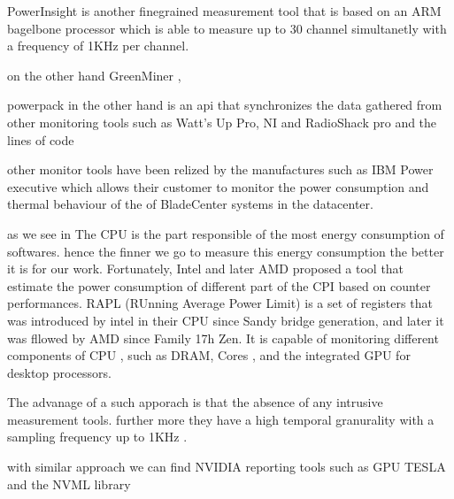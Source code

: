 PowerInsight \cite{laros2013powerinsight} is another finegrained measurement tool that is based on an ARM bagelbone processor \cite{coley2012beaglebone} which is able to measure up to 30 channel simultanetly with a frequency of 1KHz per channel.

on the other hand GreenMiner \cite{hindle2014greenminer}, %

powerpack \cite{ge2009powerpack} in the other hand is an api that synchronizes the data gathered from other monitoring tools such as Watt’s Up Pro, NI and RadioShack pro and the lines of code %

other monitor tools have been relized by the manufactures such as IBM Power executive \cite{koomey2011growth} which allows their customer to monitor the power consumption and thermal behaviour of the of BladeCenter systems in the datacenter.




as we see in %
The CPU is the part responsible of the most energy consumption of softwares. hence the finner we go to measure this energy consumption the better it is for our work.
Fortunately, Intel and later AMD proposed a tool that estimate the power consumption of different part of the CPI based on counter performances. RAPL (RUnning Average Power Limit) \cite{hackenberg2013power} \cite{hackenberg2015energy} is a set of registers that was introduced by intel in their CPU since Sandy bridge generation, and later it was fllowed by AMD since Family 17h Zen.
It is capable of monitoring different components of CPU , such as DRAM, Cores , and the integrated GPU for desktop processors.


The advanage of a such apporach is that the absence of any intrusive measurement tools. further more they have a high temporal granurality with a sampling frequency up to 1KHz \cite{ilsche_power_2015}.

with similar approach we can find NVIDIA reporting tools such as GPU TESLA \cite{burtscher2014measuring} and the NVML library \cite{fahad2019comparative}

